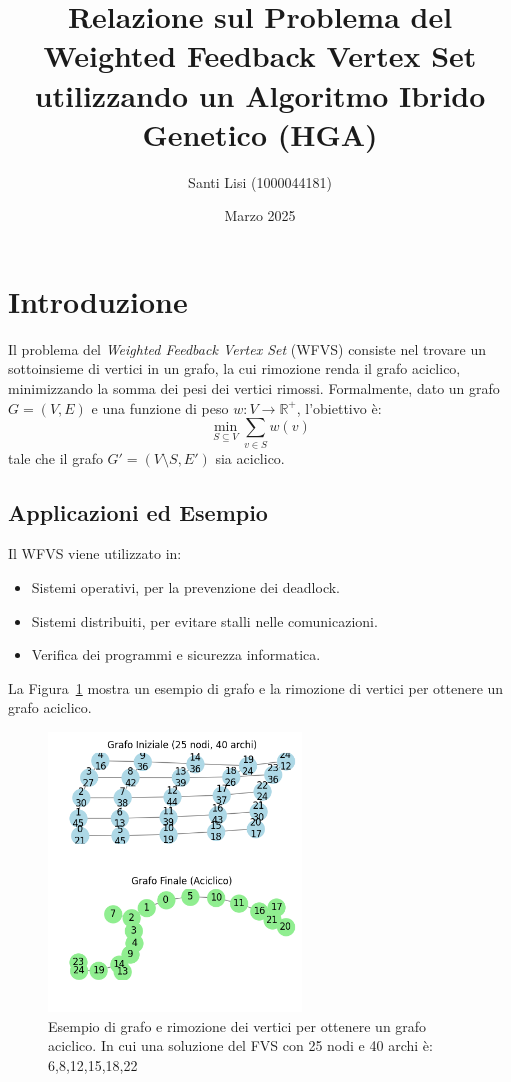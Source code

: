 \documentclass[a4paper,12pt]{article}
\title{Relazione sul Problema del Weighted Feedback Vertex Set\\
utilizzando un Algoritmo Ibrido Genetico (HGA)}
\author{Santi Lisi (1000044181)}
\date{Marzo 2025}
\begin{document}
\maketitle

\tableofcontents
\clearpage

\section{Introduzione}
Il problema del \emph{Weighted Feedback Vertex Set} (WFVS) consiste nel trovare un sottoinsieme di vertici in un grafo, la cui rimozione renda il grafo aciclico, minimizzando la somma dei pesi dei vertici rimossi. Formalmente, dato un grafo $G=(V,E)$ e una funzione di peso $w:V\rightarrow \mathbb{R}^{+}$, l'obiettivo è:
\[
\min_{S\subseteq V} \sum_{v\in S}w(v)
\]
tale che il grafo $G'=(V\setminus S, E')$ sia aciclico.

\subsection{Applicazioni ed Esempio}
Il WFVS viene utilizzato in:
\begin{itemize}
    \item Sistemi operativi, per la prevenzione dei deadlock.
    \item Sistemi distribuiti, per evitare stalli nelle comunicazioni.
    \item Verifica dei programmi e sicurezza informatica.
\end{itemize}

La Figura~\ref{fig:esempio_grafo} mostra un esempio di grafo e la rimozione di vertici per ottenere un grafo aciclico.

\begin{figure}[H]
    \centering
    \includegraphics[width=0.6\textwidth]{res/fvs_graphs_sample.png}
    \caption{Esempio di grafo e rimozione dei vertici per ottenere un grafo aciclico. In cui una soluzione del FVS con 25 nodi e 40 archi è: {6,8,12,15,18,22}}
    \label{fig:esempio_grafo}
\end{figure}
\end{document}
